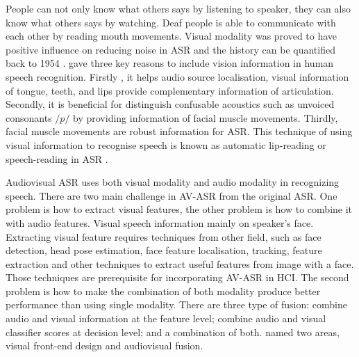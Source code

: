People can not only know what others says by listening to speaker, they can also know what others says by watching. Deaf people is able to communicate with each other by reading mouth movements. Visual modality was proved to have positive influence on reducing noise in ASR and the history can be quantified back to 1954 \cite{potamianos2003recent}. \cite{potamianos2003recent} gave three key reasons to include vision information in human speech recognition. Firstly , it helps audio source localisation, visual information of tongue, teeth, and lips provide complementary information of articulation. Secondly, it is beneficial for distinguish confusable acoustics such as unvoiced consonants $/p/$ by providing information of facial muscle movements. Thirdly, facial muscle movements are robust information for ASR. This technique of using visual information to recognise speech is known as automatic lip-reading or speech-reading in ASR \cite{potamianos2003recent}.

Audiovisual ASR uses both visual modality and audio modality in recognizing speech. There are two main challenge in AV-ASR from the original ASR. One problem is how to extract visual features, the other problem is how to combine it with audio features. Visual speech information mainly on speaker's face. Extracting visual feature requires techniques from other field, such as face detection, head pose estimation, face feature localisation, tracking, feature extraction and other techniques to extract useful features from image with a face. Those techniques are prerequisite for incorporating AV-ASR in HCI. The second problem is how to make the combination of both modality produce better performance than using single modality. There are three type of fusion: combine audio and visual information at the feature level; combine audio and visual classifier scores at decision level; and a combination of both. \cite{potamianos2003recent} named two areas, visual front-end design and audiovisual fusion.

